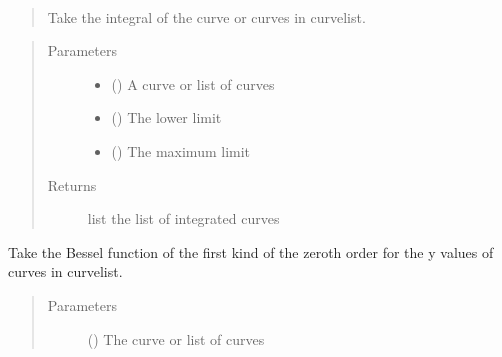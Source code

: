 \documentclass[letterpaper,10pt,english]{sphinxmanual}
\begin{document}
\begin{fulllineitems}
\label{\detokenize{pydv:pydvpy.integrate}}~\begin{quote}

Take the integral of the curve or curves in curvelist.
\end{quote}
\begin{quote}\begin{description}
\item[{Parameters}] \leavevmode\begin{itemize}
\item {} 
 () \textendash{} A curve or list of curves

\item {} 
 () \textendash{} The lower limit

\item {} 
 () \textendash{} The maximum limit

\end{itemize}

\item[{Returns}] \leavevmode
list \textendash{} the list of integrated curves

\end{description}\end{quote}

\end{fulllineitems}


\begin{fulllineitems}
\label{\detokenize{pydv:pydvpy.j0}}
Take the Bessel function of the first kind of the zeroth order for the y values of
curves in curvelist.
\begin{quote}\begin{description}
\item[{Parameters}] \leavevmode
{} () \textendash{} The curve or list of curves

\end{description}\end{quote}

\end{fulllineitems}
\end{document}
